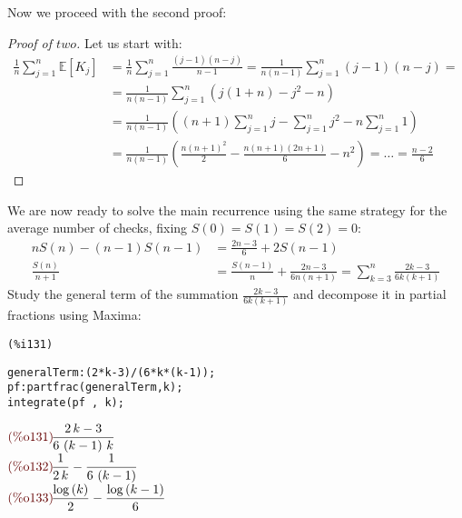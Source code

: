 Now we proceed with the second proof:
\begin{proof}[Proof of $two$]
  Let us start with:
  \begin{displaymath}
    \begin{split}
      \frac{1}{n}\sum_{j=1}^{n}{\mathbb{E} \left[K_j \right] } &=
      \frac{1}{n} \sum_{j=1}^{n}{\frac{(j-1)(n-j)}{n-1}} =
      \frac{1}{n(n-1)} \sum_{j=1}^{n}{(j-1)(n-j)}=\\
      &=\frac{1}{n(n-1)} \sum_{j=1}^{n}{(j(1+n)-j^2-n)} \\
      &=\frac{1}{n(n-1)} \left( (n+1)\sum_{j=1}^{n}{j} -
        \sum_{j=1}^{n}{j^2} -n \sum_{j=1}^{n}{1}  \right)\\
      &=\frac{1}{n(n-1)}\left( \frac{n(n+1)^2}{2} -
        \frac{n(n+1)(2n+1)}{6} - n^2 \right) = \ldots =  \frac{n-2}{6}
    \end{split}
  \end{displaymath}
\end{proof}

We are now ready to solve the main recurrence using the same strategy
for the average number of checks, fixing $S(0) = S(1) = S(2) =
0$:
\begin{displaymath}
  \begin{split}
    nS(n) - (n-1)S(n-1) &=  \frac{2n-3}{6} + 2S(n-1)\\
    \frac{S(n)}{n+1} &=  \frac{S(n-1)}{n} +  \frac{2n -3}{6n(n+1)} =
      \sum_{k=3}^{n}{ \frac{2k-3}{6k(k+1)} }
  \end{split}
\end{displaymath}
Study the general term of the summation $ \frac{2k-3}{6k(k+1)}$ and
decompose it in partial fractions using Maxima:\\
\noindent
\begin{minipage}[t]{8ex}{\color{red}\bf
\begin{verbatim}
(%i131)
\end{verbatim}}
\end{minipage}
\begin{minipage}[t]{\textwidth}{\color{blue}
\begin{verbatim}
generalTerm:(2*k-3)/(6*k*(k-1));
pf:partfrac(generalTerm,k);
integrate(pf , k);
\end{verbatim}}
\end{minipage}
\begin{math}\displaystyle
\parbox{8ex}{\color{labelcolor}(\%o131) }
\frac{2\,k-3}{6\,\left( k-1\right) \,k}
\end{math}\\
\begin{math}\displaystyle
\parbox{8ex}{\color{labelcolor}(\%o132) }
\frac{1}{2\,k}-\frac{1}{6\,\left( k-1\right) }
\end{math}\\
\begin{math}\displaystyle
\parbox{8ex}{\color{labelcolor}(\%o133) }
\frac{\mathrm{log}\left( k\right) }{2}-\frac{\mathrm{log}\left( k-1\right) }{6}
\end{math}

